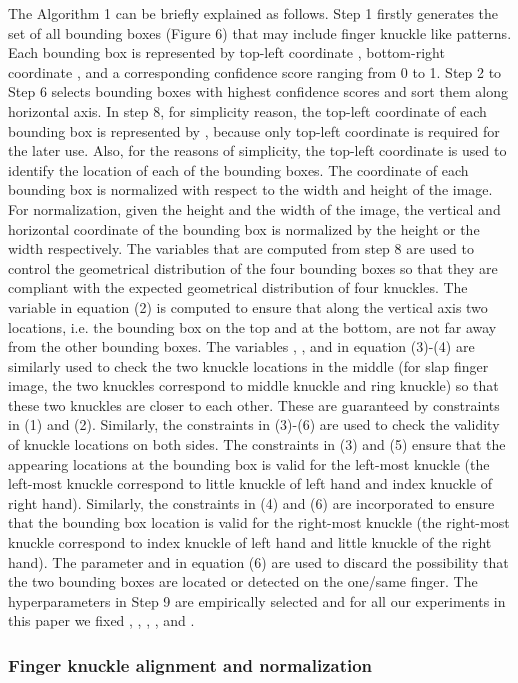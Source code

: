 The Algorithm 1 can be briefly explained as follows. Step 1 firstly generates the set of all bounding boxes (Figure 6) that may include finger knuckle like patterns. Each bounding box  is represented by top-left coordinate , bottom-right coordinate , and a corresponding confidence score  ranging from 0 to 1. Step 2 to Step 6 selects bounding boxes with highest confidence scores and sort them along horizontal axis. In step 8, for simplicity reason, the top-left coordinate of each bounding box is represented by , because only top-left coordinate is required for the later use. Also, for the reasons of simplicity, the top-left coordinate is used to identify the location of each of the bounding boxes. The coordinate of each bounding box is normalized with respect to the width and height of the image. For normalization, given the height and the width of the image, the vertical and horizontal coordinate of the bounding box is normalized by the height or the width respectively. The variables that are computed from step 8 are used to control the geometrical distribution of the four bounding boxes so that they are compliant with the expected geometrical distribution of four knuckles. The variable  in equation (2) is computed to ensure that along the vertical axis two locations, i.e. the bounding box on the top and at the bottom, are not far away from the other bounding boxes. The variables , ,  and  in equation (3)-(4) are similarly used to check the two knuckle locations in the middle (for slap finger image, the two knuckles correspond to middle knuckle and ring knuckle) so that these two knuckles are closer to each other. These are guaranteed by constraints in (1) and (2). Similarly, the constraints in (3)-(6) are used to check the validity of knuckle locations on both sides. The constraints in (3) and (5) ensure that the appearing locations at the bounding box is valid for the left-most knuckle (the left-most knuckle correspond to little knuckle of left hand and index knuckle of right hand). Similarly, the constraints in (4) and (6) are incorporated to ensure that the bounding box location is valid for the right-most knuckle (the right-most knuckle correspond to index knuckle of left hand and little knuckle of the right hand). The parameter  and  in equation (6) are used to discard the possibility that the two bounding boxes are located or detected on the one/same finger. The hyperparameters in Step 9 are empirically selected and for all our experiments in this paper we fixed , , , , and .

\subsubsection{Finger knuckle alignment and normalization}

